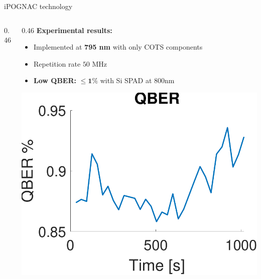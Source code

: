 \documentclass[final]{beamer}
\begin{document}
\begin{frame}
\begin{textblock}{0.965}
\begin{block}{\large iPOGNAC technology }
\begin{columns}
\begin{column}{0.46\TPHorizModule}
\begin{itemize}
					\end{itemize}
				\end{column}

				\begin{column}{0.46\TPHorizModule}
					\textbf{\hskip 1cm Experimental results:}\\
					\vskip 0.1cm
					\begin{itemize}
						\item Implemented at \textbf{795 nm} with only COTS components  \\
						\item Repetition rate $50$ MHz
						\item \textbf{Low QBER:} $\le \bm{1\%}$ with Si SPAD at 800nm
					\end{itemize}
					\vskip 1.5cm
						{\centering
							\includegraphics[width=0.4\TPHorizModule]{imgs/synchESA_fig_r5.pdf}\\
						}
				\end{column}
			\end{columns}

		\end{block}
	\end{textblock}


\end{frame}
\end{document}
